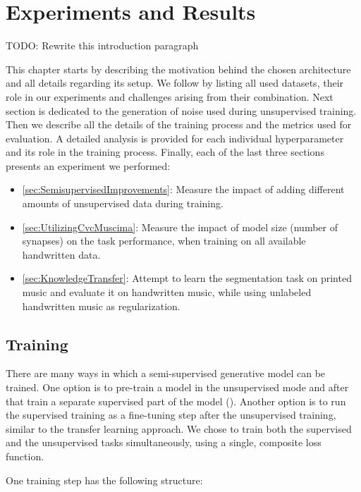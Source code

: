 \chapter{Experiments and Results}
\label{chap:ExperimentsAndResults}

TODO: Rewrite this introduction paragraph

This chapter starts by describing the motivation behind the chosen architecture and all details regarding its setup. We follow by listing all used datasets, their role in our experiments and challenges arising from their combination. Next section is dedicated to the generation of noise used during unsupervised training. Then we describe all the details of the training process and the metrics used for evaluation. A detailed analysis is provided for each individual hyperparameter and its role in the training process. Finally, each of the last three sections presents an experiment we performed:

\begin{itemize}
    \item \ref{sec:SemisupervisedImprovements}: Measure the impact of adding different amounts of unsupervised data during training.
    \item \ref{sec:UtilizingCvcMuscima}: Measure the impact of model size (number of synapses) on the task performance, when training on all available handwritten data.
    \item \ref{sec:KnowledgeTransfer}: Attempt to learn the segmentation task on printed music and evaluate it on handwritten music, while using unlabeled handwritten music as regularization.
\end{itemize}


\section{Training}
\label{sec:Training}

There are many ways in which a semi-supervised generative model can be trained. One option is to pre-train a model in the unsupervised mode and after that train a separate supervised part of the model (\cite{KingmaSslVae}). Another option is to run the supervised training as a fine-tuning step after the unsupervised training, similar to the transfer learning approach. We chose to train both the supervised and the unsupervised tasks simultaneously, using a single, composite loss function.

One training step has the following structure:

